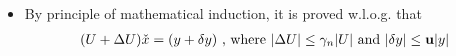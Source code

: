 \documentclass[11pt,a4paper]{article}
\begin{document}
\begin{itemize}
\begin{proof}
\begin{align}
{\begin{array}{c|c}
                    \end{array} \right)
            }_{U_{(p+1)}}
                +
                \underbrace{
                \left( \begin{array}{c|c}
                        \delta v_{11(p)} &   \delta u_{12(p)}^T \\\hline
                        0 & \Delta U_{(p)} 
                    \end{array} \right)
            }_{\Delta U_{(p+1)}}
                \Bigg)
                \underbrace{
                \left( \begin{array}{c} \cchi_{1(p)} \\\hline \check{x}_{2(p)} \end{array} \right)
            }_{\check{x}_{2(p+1)}}
                &= 
                \Bigg(
                \underbrace{
                \left( \begin{array}{c} \psi_{1(p)} \\\hline
                       y_{2(p)}  \end{array} \right)
            }_{y_{2(p+1)}}
               +
                \underbrace{
                \left( \begin{array}{c}  \delta \psi_{1(p)}  \\\hline
                       \Delta y_{2(p)} \end{array} \right)
            }_{\delta y_{2(p+1)}}
                \Bigg) \\
                (U_{(p+1)} + \Delta U_{(p+1)}) \check{x}_{2(p+1)} 
                &= (y_{2(p+1)} + \delta y_{2(p+1)})
            \end{align}
            where $|\Delta U_{(p+1)} | \leq \gamma_n |U_{(p+1)}|$ 
            and $|\delta y_{2(p+1)}| \leq \bu |y_{2(p+1)}|$.
            \\ Hence, we sucessfully proved \eqref{pp1conclusion}.
        \end{proof}
    \item By principle of mathematical induction, it is proved w.l.o.g. that 
        \begin{align}
            (U + \Delta U) \check{x} = (y + \delta y)
            \text{ , where } |\Delta U | \leq \gamma_n |U| 
            \text{ and } |\delta y| \leq \mathbf{u} |y|
        \end{align}
\end{itemize}
\end{document}

